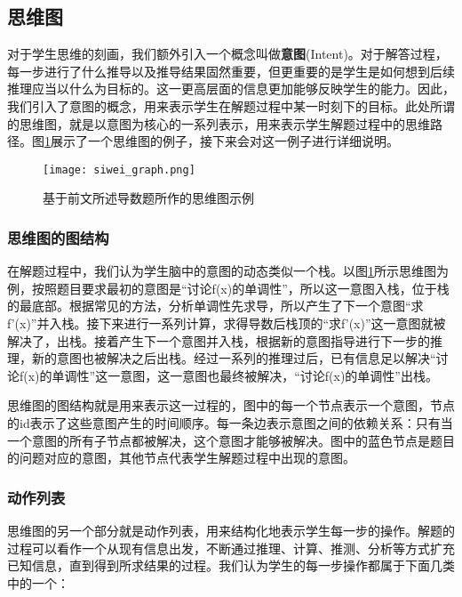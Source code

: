 \subsection{思维图}

对于学生思维的刻画，我们额外引入一个概念叫做\textbf{意图}(Intent)。对于解答过程，每一步进行了什么推导以及推导结果固然重要，但更重要的是学生是如何想到后续推理应当以什么为目标的。这一更高层面的信息更加能够反映学生的能力。因此，我们引入了意图的概念，用来表示学生在解题过程中某一时刻下的目标。此处所谓的思维图，就是以意图为核心的一系列表示，用来表示学生解题过程中的思维路径。图\ref{fig:siwei_graph}展示了一个思维图的例子，接下来会对这一例子进行详细说明。

\begin{figure}
    \centering
    \texttt{[image: siwei\_graph.png]}
    \caption{基于前文所述导数题所作的思维图示例}
    \label{fig:siwei_graph}
\end{figure}

\subsubsection*{思维图的图结构}

在解题过程中，我们认为学生脑中的意图的动态类似一个栈。以图\ref{fig:siwei_graph}所示思维图为例，按照题目要求最初的意图是“讨论f(x)的单调性”，所以这一意图入栈，位于栈的最底部。根据常见的方法，分析单调性先求导，所以产生了下一个意图“求f'(x)”并入栈。接下来进行一系列计算，求得导数后栈顶的“求f'(x)”这一意图就被解决了，出栈。接着产生下一个意图并入栈，根据新的意图指导进行下一步的推理，新的意图也被解决之后出栈。经过一系列的推理过后，已有信息足以解决“讨论f(x)的单调性”这一意图，这一意图也最终被解决，“讨论f(x)的单调性”出栈。

思维图的图结构就是用来表示这一过程的，图中的每一个节点表示一个意图，节点的id表示了这些意图产生的时间顺序。每一条边表示意图之间的依赖关系：只有当一个意图的所有子节点都被解决，这个意图才能够被解决。图中的蓝色节点是题目的问题对应的意图，其他节点代表学生解题过程中出现的意图。

\subsubsection*{动作列表}

思维图的另一个部分就是动作列表，用来结构化地表示学生每一步的操作。解题的过程可以看作一个从现有信息出发，不断通过推理、计算、推测、分析等方式扩充已知信息，直到得到所求结果的过程。我们认为学生的每一步操作都属于下面几类中的一个：

